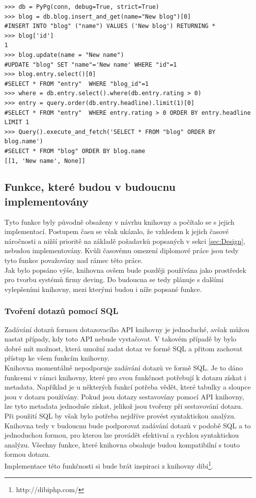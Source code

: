 \documentclass[ing,male,java,dept456]{diploma}						%
\begin{document}
\clearpage

\begin{lstlisting}[style=custompython, label=src:pypg, caption={Návrh syntaxe knihovny pypg}]
>>> db = PyPg(conn, debug=True, strict=True)
>>> blog = db.blog.insert_and_get(name="New blog")[0]
#INSERT INTO "blog" ("name") VALUES ('New blog') RETURNING *
>>> blog['id']
1
>>> blog.update(name = "New name")
#UPDATE "blog" SET "name"='New name' WHERE "id"=1 
>>> blog.entry.select()[0]
#SELECT * FROM "entry"  WHERE "blog_id"=1
>>> where = db.entry.select().where(db.entry.rating > 0)
>>> entry = query.order(db.entry.headline).limit(1)[0]
#SELECT * FROM "entry"  WHERE entry.rating > 0 ORDER BY entry.headline LIMIT 1
>>> Query().execute_and_fetch('SELECT * FROM "blog" ORDER BY blog.name')
#SELECT * FROM "blog" ORDER BY blog.name
[[1, 'New name', None]]
\end{lstlisting}

\subsection{Funkce, které budou v budoucnu implementovány}

Tyto funkce byly původně obsaženy v návrhu knihovny a počítalo se s jejich implementací. Postupem času se však ukázalo, že vzhledem k jejich časové náročnosti a nižší prioritě na základě požadavků popsaných v sekci \ref{sec:Design}, nebudou implementovány. Kvůli časovému omezení diplomové práce jsou tedy tyto funkce považovány nad rámec této práce. \\
Jak bylo popsáno výše, knihovna ovšem bude později používána jako prostředek pro tvorbu systémů firmy deving. Do budoucna se tedy plánuje s dalšími vylepšeními knihovny, mezi kterými budou i níže popsané funkce.

\subsubsection{Tvoření dotazů pomocí SQL}

Zadávání dotazů formou dotazovacího API knihovny je jednoduché, avšak můžou nastat případy, kdy toto API nebude vystačovat. V takovém případě by bylo dobré mít možnost, která umožní zadat dotaz ve formě SQL a přitom zachovat přístup ke všem funkcím  knihovny. \\
Knihovna momentálně nepodporuje zadávání dotazů ve formě SQL. Je to dáno funkcemi v rámci knihovny, které pro svou funkčnost potřebují k dotazu získat i metadata. Například je u některých funkcí potřeba vědět, které tabulky a sloupce jsou v dotazu používány. Pokud jsou dotazy sestavovány pomocí API knihovny, lze tyto metadata jednoduše získat, jelikož jsou tvořeny při sestavování dotazu. Při použití SQL by však bylo potřeba nejdříve provést syntaktickou analýzu. \\
Knihovna tedy v budoucnu bude podporovat zadávání dotazů v podobě SQL a to jednoduchou formou, pro kterou lze provádět efektivní a rychlou syntaktickou analýzu. Všechny funkce, které knihovna obsahuje budou kompatibilní s touto formou dotazu. \\
Implementace této funkčnosti si bude brát inspiraci z knihovny dibi\footnote{http://dibiphp.com/}.
\end{document}
